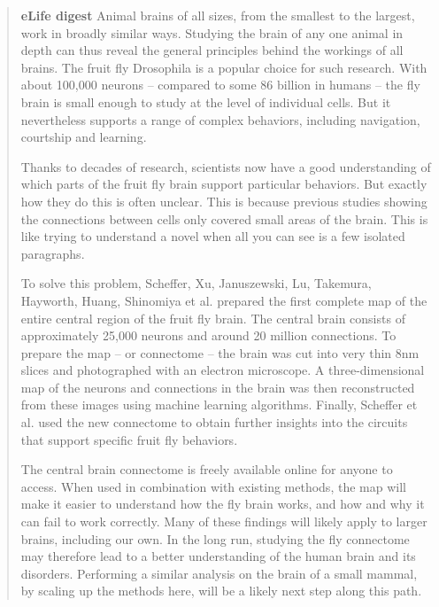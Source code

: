 \documentclass{article}
\begin{document}
\begin{quote}
\noindent\textbf{eLife digest} Animal brains of all sizes, from the smallest to the largest, work in broadly similar ways. Studying the brain of any one animal in depth can thus reveal the general principles behind the workings of all brains. The fruit fly Drosophila is a popular choice for such research. With about 100,000 neurons – compared to some 86 billion in humans – the fly brain is small enough to study at the level of individual cells. But it nevertheless supports a range of complex behaviors, including navigation, courtship and learning.

Thanks to decades of research, scientists now have a good understanding of which parts of the fruit fly brain support particular behaviors. But exactly how they do this is often unclear. This is because previous studies showing the connections between cells only covered small areas of the brain. This is like trying to understand a novel when all you can see is a few isolated paragraphs.

To solve this problem, Scheffer, Xu, Januszewski, Lu, Takemura, Hayworth, Huang, Shinomiya et al. prepared the first complete map of the entire central region of the fruit fly brain. The central brain consists of approximately 25,000 neurons and around 20 million connections. To prepare the map – or connectome – the brain was cut into very thin 8nm slices and photographed with an electron microscope. A three-dimensional map of the neurons and connections in the brain was then reconstructed from these images using machine learning algorithms. Finally, Scheffer et al. used the new connectome to obtain further insights into the circuits that support specific fruit fly behaviors.

The central brain connectome is freely available online for anyone to access. When used in combination with existing methods, the map will make it easier to understand how the fly brain works, and how and why it can fail to work correctly. Many of these findings will likely apply to larger brains, including our own. In the long run, studying the fly connectome may therefore lead to a better understanding of the human brain and its disorders. Performing a similar analysis on the brain of a small mammal, by scaling up the methods here, will be a likely next step along this path.
\end{quote}
\end{document}
